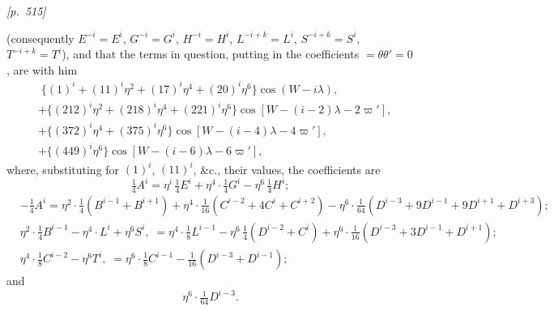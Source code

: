 \documentclass[11pt]{article}
\begin{document}


\noindent\textit{[p.~515]}

\medskip

\noindent (consequently $E^{-i}=E^i$, $G^{-i}=G^i$, $H^{-i}=H^i$,
$L^{-i+k}=L^i$, $S^{-i+k}=S^i$, $T^{-i+k}=T^i$), and that the terms in
question, putting in the coefficients $=\theta\theta'=0$, are with him
\[
\begin{aligned}
&\;\{(1)^i+(11)^i\eta^2+(17)^i\eta^4+(20)^i\eta^6\}\cos(W-i\lambda),\\
&+\{(212)^i\eta^2+(218)^i\eta^4+(221)^i\eta^6\}\cos[W-(i-2)\lambda-2\varpi'],\\
&+\{(372)^i\eta^4+(375)^i\eta^6\}\cos[W-(i-4)\lambda-4\varpi'],\\
&+\{(449)^i\eta^6\}\cos[W-(i-6)\lambda-6\varpi'],
\end{aligned}
\]
where, substituting for $(1)^i$, $(11)^i$, \&c., their values, the coefficients are
\[
\tfrac{1}{4}A^i=\eta^i\,\tfrac{1}{4}E^i+\eta^4\cdot\tfrac{1}{4}G^i-\eta^6\,\tfrac{1}{4}H^i;
\]
\[
\begin{aligned}
&-\tfrac{1}{4}A^i=\eta^2\cdot\tfrac{1}{4}(B^{i-1}+B^{i+1})+\eta^4\cdot\tfrac{1}{16}(C^{i-2}+4C^i+C^{i+2})-\eta^6\cdot\tfrac{1}{64}(D^{i-3}+9D^{i-1}+9D^{i+1}+D^{i+3});\\
&\eta^2\cdot\tfrac{1}{4}B^{i-1}-\eta^4\cdot L^i+\eta^6S^i,\;=\eta^4\cdot\tfrac{1}{8}L^{i-1}-\eta^6\,\tfrac{1}{4}(D^{i-2}+C^i)+\eta^6\cdot\tfrac{1}{16}(D^{i-3}+3D^{i-1}+D^{i+1});\\
&\eta^4\cdot\tfrac{1}{8}C^{i-2}-\eta^6T^i,\;=\eta^6\cdot\tfrac{1}{8}C^{i-1}-\tfrac{1}{16}(D^{i-3}+D^{i-1});
\end{aligned}
\]
and
\[
\eta^6\cdot\tfrac{1}{64}D^{i-3}.
\]
\end{document}
